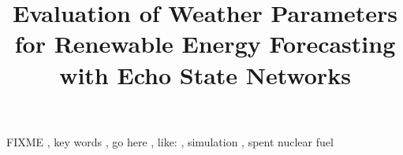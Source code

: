 \documentclass[3p, twocolumn]{elsarticle}
\begin{document}
\begin{frontmatter}
\title{Evaluation of Weather Parameters for Renewable Energy Forecasting with Echo State Networks}






\begin{keyword}
FIXME \sep
key words \sep
go here \sep
like: \sep
simulation \sep
spent nuclear fuel
\end{keyword}


\end{frontmatter}
\glsresetall

\linenumbers

\prntlen{\columnwidth}










%
\end{document}
